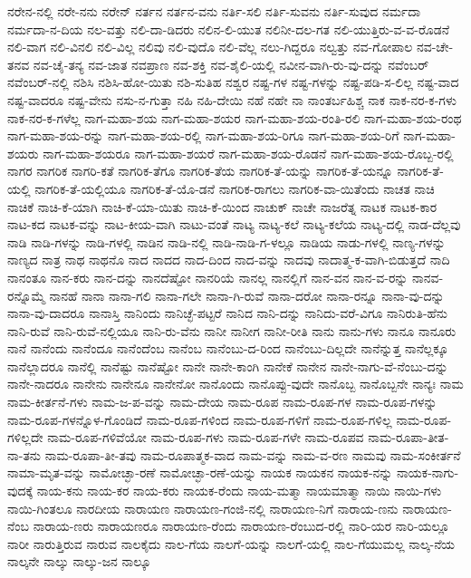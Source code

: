 {ನರೇನ-ನಲ್ಲಿ
ನರೇ-ನನು
ನರೇನ್
ನರ್ತನ
ನರ್ತನ-ವನು
ನರ್ತಿ-ಸಲಿ
ನರ್ತಿ-ಸುವನು
ನರ್ತಿ-ಸುವುದ
ನರ್ಮದಾ
ನರ್ಮದಾ-ನ-ದಿಯ
ನಲ-ವತ್ತು
ನಲಿ-ದಾ-ಡಿದರು
ನಲಿನ-ಲಿ-ಯುತ
ನಲಿನೀ-ದಲ-ಗತ
ನಲಿ-ಯುತ್ತಿರು-ವ-ವ-ರೊಡನೆ
ನಲಿ-ವಾಗ
ನಲಿ-ವಿನಲಿ
ನಲಿ-ವಿಲ್ಲ
ನಲಿವು
ನಲಿ-ವುದೊ
ನಲಿ-ವೆಲ್ಲ
ನಲು-ಗಿದ್ದರೂ
ನಲ್ವತ್ತು
ನವ-ಗೋಪಾಲ
ನವ-ಚೇ-ತನವ
ನವ-ಚೈ-ತನ್ಯ
ನವ-ಜಾತ
ನವಪ್ರಾಣ
ನವ-ಶಕ್ತಿ
ನವ-ಶೈಲಿ-ಯಲ್ಲಿ
ನವೀನ-ವಾಗಿ-ರು-ವು-ದನ್ನು
ನವೆಂಬರ್
ನವೆಂಬರ್-ನಲ್ಲಿ
ನಶಿಸಿ
ನಶಿಸಿ-ಹೋ-ಯಿತು
ನಶಿ-ಸುತಿಹ
ನಶ್ವರ
ನಷ್ಟ-ಗಳ
ನಷ್ಟ-ಗಳನ್ನು
ನಷ್ಟ-ಪಡಿ-ಸ-ಲಿಲ್ಲ
ನಷ್ಟ-ವಾದ
ನಷ್ಟ-ವಾದರೂ
ನಷ್ಟ-ವೇನು
ನಸು-ನ-ಗುತ್ತಾ
ನಹಿ
ನಹಿ-ದೇಯಿ
ನಹೆ
ನಹೇ
ನಾ
ನಾಂತರ್ಬಹಿಶ್ಚ
ನಾಕ
ನಾಕ-ನರ-ಕ-ಗಳು
ನಾಕ-ನರ-ಕ-ಗಳೆಲ್ಲ
ನಾಗ-ಮಹಾ-ಶಯ
ನಾಗ-ಮಹಾ-ಶಯರ
ನಾಗ-ಮಹಾ-ಶಯ-ರಂತಿ-ರಲಿ
ನಾಗ-ಮಹಾ-ಶಯ-ರಂಥ
ನಾಗ-ಮಹಾ-ಶಯ-ರನ್ನು
ನಾಗ-ಮಹಾ-ಶಯ-ರಲ್ಲಿ
ನಾಗ-ಮಹಾ-ಶಯ-ರಿಗೂ
ನಾಗ-ಮಹಾ-ಶಯ-ರಿಗೆ
ನಾಗ-ಮಹಾ-ಶಯರು
ನಾಗ-ಮಹಾ-ಶಯರೂ
ನಾಗ-ಮಹಾ-ಶಯರೆ
ನಾಗ-ಮಹಾ-ಶಯ-ರೊಡನೆ
ನಾಗ-ಮಹಾ-ಶಯ-ರೊಬ್ಬ-ರಲ್ಲಿ
ನಾಗರ
ನಾಗರಿಕ
ನಾಗರಿ-ಕತೆ
ನಾಗರಿಕ-ತೆಗೂ
ನಾಗರಿಕ-ತೆಯ
ನಾಗರಿಕ-ತೆ-ಯನ್ನು
ನಾಗರಿಕ-ತೆ-ಯನ್ನೂ
ನಾಗರಿಕ-ತೆ-ಯಲ್ಲಿ
ನಾಗರಿಕ-ತೆ-ಯಲ್ಲಿಯೂ
ನಾಗರಿಕ-ತೆ-ಯೊ-ಡನೆ
ನಾಗರಿಕ-ರಾಗಲು
ನಾಗರಿಕ-ವಾ-ಯಿತೆಂದು
ನಾಚತ
ನಾಚಿ
ನಾಚಿಕೆ
ನಾಚಿ-ಕೆ-ಯಾಗಿ
ನಾಚಿ-ಕೆ-ಯಾ-ಯಿತು
ನಾಚಿ-ಕೆ-ಯಿಂದ
ನಾಚುಕ್
ನಾಚೇ
ನಾಜರೆತ್ನ
ನಾಟಕ
ನಾಟಕ-ಕಾರ
ನಾಟ-ಕದ
ನಾಟಕ-ವನ್ನು
ನಾಟ-ಕೀಯ-ವಾಗಿ
ನಾಟು-ವಂತೆ
ನಾಟ್ಯ
ನಾಟ್ಯ-ಕಲೆ
ನಾಟ್ಯ-ಕಲೆಯ
ನಾಟ್ಯ-ದಲ್ಲಿ
ನಾಡ-ದೆಲ್ಲವು
ನಾಡಿ
ನಾಡಿ-ಗಳನ್ನು
ನಾಡಿ-ಗಳಲ್ಲಿ
ನಾಡಿನ
ನಾಡಿ-ನಲ್ಲಿ
ನಾಡಿ-ನಾಡಿ-ಗ-ಳಲ್ಲೂ
ನಾಡಿಯ
ನಾಡು-ಗಳಲ್ಲಿ
ನಾಣ್ಯ-ಗಳನ್ನು
ನಾಣ್ಯದ
ನಾತ್ರ
ನಾಥ
ನಾಥನೊ
ನಾದ
ನಾದದ
ನಾದ-ದಿಂದ
ನಾದ-ವನ್ನು
ನಾದವು
ನಾದಾತ್ಮ-ಕ-ವಾಗಿ-ಬಿಡುತ್ತದೆ
ನಾದಿ
ನಾನಂತೂ
ನಾನ-ಕರು
ನಾನ-ದನ್ನು
ನಾನದೆಷ್ಟೋ
ನಾನರಿಯೆ
ನಾನಲ್ಲ
ನಾನಲ್ಲಿಗೆ
ನಾನ-ವನ
ನಾನ-ವ-ರನ್ನು
ನಾನವ-ರನ್ನೊಮ್ಮೆ
ನಾನಹೆ
ನಾನಾ
ನಾನಾ-ಗಲಿ
ನಾನಾ-ಗಲೇ
ನಾನಾ-ಗಿ-ರುವೆ
ನಾನಾ-ದರೋ
ನಾನಾ-ರನ್ನೂ
ನಾನಾ-ವು-ದನ್ನು
ನಾನಾ-ವು-ದಾದರೂ
ನಾನಾಸ್ತಿ
ನಾನಿಂದು
ನಾನಿಚ್ಛೆ-ಪಟ್ಟರೆ
ನಾನಿದ
ನಾನಿ-ದನ್ನು
ನಾನಿದು-ವರೆ-ವಿಗೂ
ನಾನಿರುತಿ-ಹೆನು
ನಾನಿ-ರುವೆ
ನಾನಿ-ರುವೆ-ನಲ್ಲಿಯೂ
ನಾನಿ-ರು-ವೆನು
ನಾನೀ
ನಾನೀಗ
ನಾನೀ-ರೀತಿ
ನಾನು
ನಾನು-ಗಳು
ನಾನೂ
ನಾನೂರು
ನಾನೆ
ನಾನೆಂದು
ನಾನೆಂದೂ
ನಾನೆಂದೆಂಬ
ನಾನೆಂಬ
ನಾನೆಂಬು-ದ-ರಿಂದ
ನಾನೆಂಬು-ದಿಲ್ಲದೇ
ನಾನೆನ್ನುತ್ತ
ನಾನೆಲ್ಲಕ್ಕೂ
ನಾನೆಲ್ಲಾದರೂ
ನಾನೆಲ್ಲಿ
ನಾನೆಷ್ಟು
ನಾನೆಷ್ಟೋ
ನಾನೇ
ನಾನೇ-ಕಾಂಗಿ
ನಾನೇಕೆ
ನಾನೇನ
ನಾನೇ-ನಾಗು-ವೆ-ನೆಂಬು-ದನ್ನು
ನಾನೇ-ನಾದರೂ
ನಾನೇನು
ನಾನೇನೂ
ನಾನೇನೋ
ನಾನೊಂದು
ನಾನೊಪ್ಪು-ವುದೇ
ನಾನೊಬ್ಬ
ನಾನೊಬ್ಬನೇ
ನಾನ್ಯಃ
ನಾಮ
ನಾಮ-ಕೀರ್ತನೆ-ಗಳು
ನಾಮ-ಜ-ಪ-ವನ್ನು
ನಾಮ-ದೇಯ
ನಾಮ-ರೂಪ
ನಾಮ-ರೂಪ-ಗಳ
ನಾಮ-ರೂಪ-ಗಳನ್ನು
ನಾಮ-ರೂಪ-ಗಳನ್ನೊಳ-ಗೊಂಡಿದೆ
ನಾಮ-ರೂಪ-ಗಳಿಂದ
ನಾಮ-ರೂಪ-ಗಳಿಗೆ
ನಾಮ-ರೂಪ-ಗಳಿಲ್ಲ
ನಾಮ-ರೂಪ-ಗಳಿಲ್ಲದೇ
ನಾಮ-ರೂಪ-ಗಳಿವೆಯೋ
ನಾಮ-ರೂಪ-ಗಳು
ನಾಮ-ರೂಪ-ಗಳೇ
ನಾಮ-ರೂಪವ
ನಾಮ-ರೂಪಾ-ತೀತ-ನಾ-ತನು
ನಾಮ-ರೂಪಾ-ತೀ-ತವು
ನಾಮ-ರೂಪಾತ್ಮಕ-ವಾದ
ನಾಮ-ವನ್ನು
ನಾಮ-ವ-ರಣ
ನಾಮವು
ನಾಮ-ಸಂಕೀರ್ತನೆ
ನಾಮಾ-ಮೃತ-ವನ್ನು
ನಾಮೋಚ್ಛಾ-ರಣೆ
ನಾಮೋಚ್ಛಾ-ರಣೆ-ಯನ್ನು
ನಾಯಕ
ನಾಯಕನ
ನಾಯಕ-ನನ್ನು
ನಾಯಕ-ನಾಗು-ವುದಕ್ಕೆ
ನಾಯ-ಕನು
ನಾಯ-ಕರ
ನಾಯ-ಕರು
ನಾಯಕ-ರೆಂದು
ನಾಯ-ಮತ್ಮಾ
ನಾಯಮಾತ್ಮಾ
ನಾಯಿ
ನಾಯಿ-ಗಳು
ನಾಯಿ-ಗಿಂತಲೂ
ನಾರದೀಯ
ನಾರಾಯಣ
ನಾರಾಯಣ-ಗಂಜಿ-ನಲ್ಲಿ
ನಾರಾಯಣ-ನಿಗೆ
ನಾರಾಯ-ಣನು
ನಾರಾಯಣ-ನೆಂಬ
ನಾರಾಯ-ಣರು
ನಾರಾಯಣರೂ
ನಾರಾಯಣ-ರೆಂದು
ನಾರಾಯಣ-ರೆಂಬುದ-ರಲ್ಲಿ
ನಾರಿ-ಯರ
ನಾರಿ-ಯಲ್ಲೂ
ನಾರೀ
ನಾರುತ್ತಿರುವ
ನಾರುವ
ನಾಲಕೈದು
ನಾಲ-ಗೆಯ
ನಾಲಗೆ-ಯನ್ನು
ನಾಲಗೆ-ಯಲ್ಲಿ
ನಾಲ-ಗೆಯುಮಲ್ಲ
ನಾಲ್ಕ-ನೆಯ
ನಾಲ್ಕನೇ
ನಾಲ್ಕು
ನಾಲ್ಕು-ಜನ
ನಾಲ್ಕೂ
}
